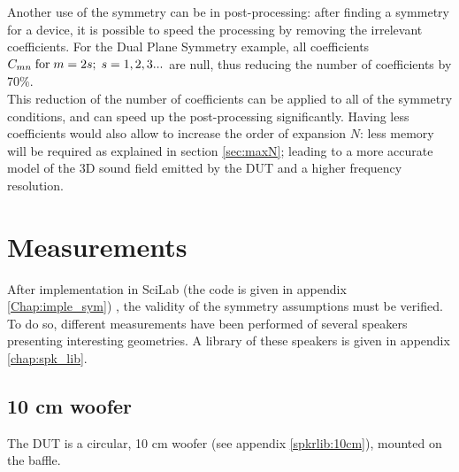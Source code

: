 \documentclass{report}
\begin{document}
Another use of the symmetry can be in post-processing: after finding a symmetry for a device, it is possible to speed the processing by removing the irrelevant coefficients. For the Dual Plane Symmetry example, all coefficients  $C_{mn} \;  \textup{for} \;  m = 2s; \; s =1, 2, 3...$ are null, thus reducing the number of coefficients by 70\%.\\
This reduction of the number of coefficients can be applied to all of the symmetry conditions, and can speed up the post-processing significantly. Having less coefficients would also allow to increase the order of expansion $N$: less memory will be required as explained in section \ref{sec:maxN}; leading to a more accurate model of the 3D sound field emitted by the DUT and a higher frequency resolution.

\newpage

\section{Measurements}

After implementation in SciLab (the code is given in appendix \ref{Chap:imple_sym}) , the validity of the symmetry assumptions must be verified. To do so, different measurements have been performed of several speakers presenting interesting geometries. A library of these speakers is given in appendix \ref{chap:spk_lib}. 


\subsection{10 cm woofer}

The DUT is a circular, 10 cm woofer (see appendix \ref{spkrlib:10cm}), mounted on the baffle. \\
\end{document}
